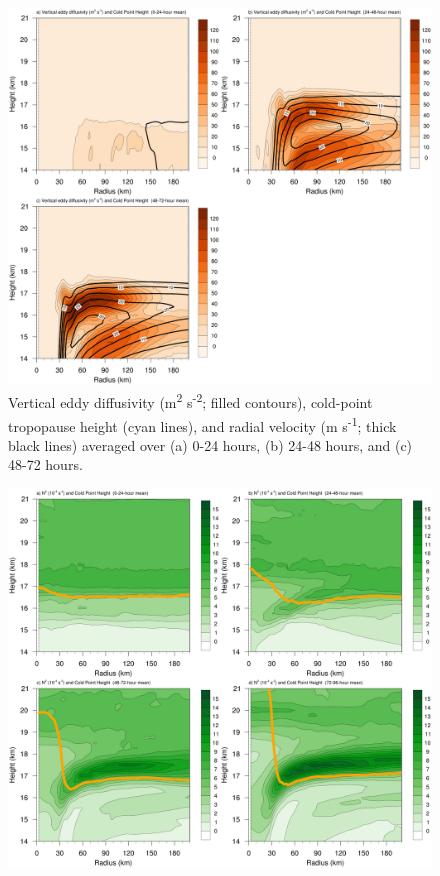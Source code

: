 \documentclass{ametsoc}
\begin{document}
\begin{figure}[ht]
\centerline{\includegraphics[width=39pc]{figures/khvten.png}}
\caption{Vertical eddy diffusivity (m\textsuperscript{2} s\textsuperscript{-2}; filled contours), cold-point tropopause height (cyan lines), and radial velocity (m s\textsuperscript{-1}; thick black lines) averaged over (a) 0-24 hours, (b) 24-48 hours, and (c) 48-72 hours.}
\label{fig:diff}
\end{figure}

\begin{figure}[ht]
\centerline{\includegraphics[width=39pc]{figures/n2-1000km.png}}
\label{fig:n2-1000km}
\end{figure}
\end{document}
